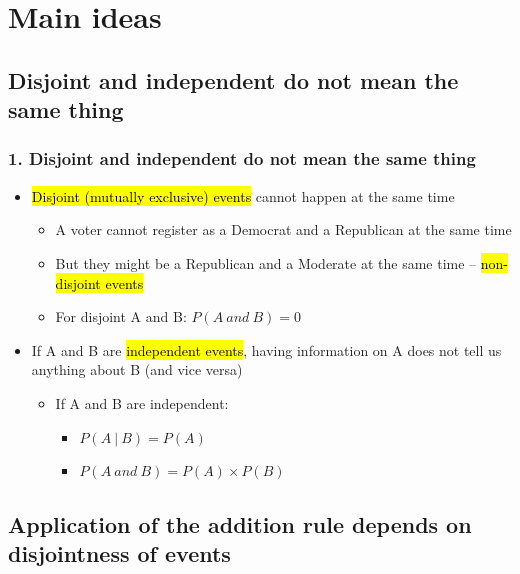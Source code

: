 \documentclass[11pt,containsverbatim,handout,xcolor=xelatex,dvipsnames,table]{beamer}
\begin{document}

\section{Main ideas}


\subsection{Disjoint and independent do not mean the same thing}
\label{mi1}


\begin{frame}
\frametitle{1. Disjoint and independent do not mean the same thing}

\begin{itemize}

\item \hl{Disjoint (mutually exclusive) events} cannot happen at the same time
\begin{itemize}
\item A voter cannot register as a Democrat and a Republican at the same time
\item But they might be a Republican and a Moderate at the same time -- 
\hl{non-disjoint events}
\item For disjoint A and B: $P(A~and~B) = 0$
\end{itemize}

\pause

\item If A and B are \hl{independent events}, having information on A does 
not tell us anything about B (and vice versa)
\begin{itemize}
\item If A and B are independent: 
\begin{itemize}
\item $P(A~|~B) = P(A)$
\item $P(A~and~B) = P(A) \times P(B)$
\end{itemize}
\end{itemize}

\end{itemize}
\end{frame}


\subsection{Application of the addition rule depends on disjointness of events}
\label{mi2}
\end{document}

